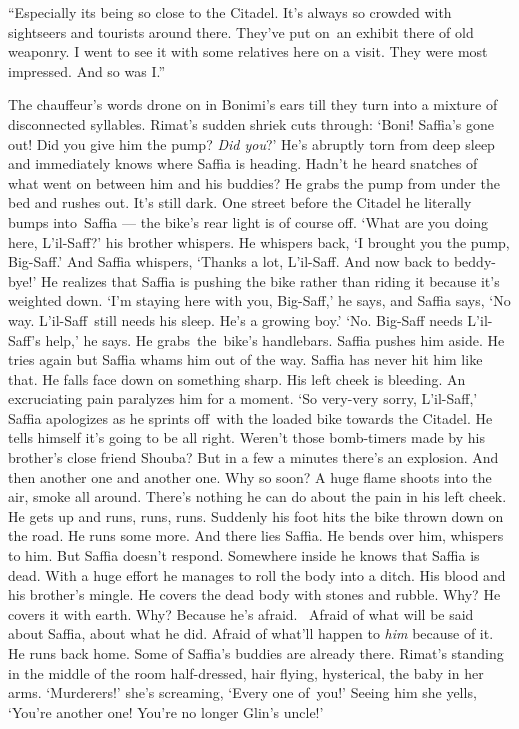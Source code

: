 \documentclass[twoside,11pt,openany]{book}
\begin{document}
``Especially its being so close to the Citadel. It's always so crowded with sightseers and tourists around
there. They've put on~an exhibit there of old weaponry. I went to see it with some relatives here on a visit. They were
most impressed. And so was I.''

The chauffeur's words drone on in Bonimi's ears till they turn into a mixture of disconnected syllables. Rimat's sudden
shriek cuts through:  `Boni! Saffia's gone out! Did you give him the pump? \textit{Did you}?' He's abruptly torn
from deep sleep and immediately knows where Saffia is heading. Hadn't he heard snatches of what went on between him
and his buddies? He grabs the pump from under the bed and rushes out. It's still dark. One street before the Citadel he
literally bumps into~Saffia ---  the bike's rear light is of course off. `What are you doing here, L'il-Saff?' his
brother whispers. He whispers back, `I brought you the pump, Big-Saff.' And Saffia whispers, `Thanks a lot, L'il-Saff.
And now back to beddy-bye!'  He realizes that Saffia is pushing the bike rather than riding it because it's weighted
down. `I'm staying here with you, Big-Saff,' he says, and Saffia says, `No way. L'il-Saff~still needs his sleep. He's
a growing boy.'  `No. Big-Saff needs L'il-Saff's help,' he says. He grabs~the~bike's handlebars. Saffia pushes him
aside. He tries again but Saffia whams him out of the way. Saffia has never hit him like that. He falls face down on
something sharp. His left cheek{ }is bleeding. An excruciating pain paralyzes him for a moment. `So
very-very sorry, L'il-Saff,' Saffia apologizes as he sprints off~with the loaded bike towards the Citadel. He tells
himself it's going to be all right. Weren't those bomb-timers made by his brother's close friend Shouba? But in a few a
minutes there's an explosion. And then another one and another one. Why so soon? A huge flame shoots into the air,
smoke all around. There's nothing he can do about the pain in his left cheek. He gets up and runs, runs, runs. Suddenly
his foot hits the bike thrown down on the road. He runs some more. And there lies Saffia. He bends over him, whispers
to him. But Saffia doesn't respond. Somewhere inside he knows that Saffia is dead. With a huge effort he manages to
roll the body into a ditch. His blood and his brother's mingle{. }He covers the dead body with stones
and rubble. Why? He covers it with earth. Why? Because he's afraid. ~Afraid of what will be said about Saffia, about
what he did. Afraid of what'll happen to \textit{him} because of it. He runs back home. Some of Saffia's buddies are
already there. Rimat's standing in the middle of the room half-dressed, hair flying, hysterical, the baby in her arms.
`Murderers!{}' she's screaming, `Every one of~you!'  Seeing him she yells, `You're another one! You're no
longer Glin's uncle!'
\end{document}
